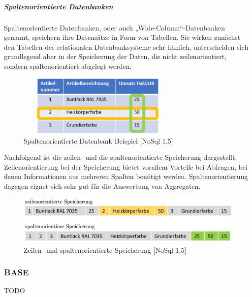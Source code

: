\subparagraph{Spaltenorientierte Datenbanken}
Spaltenorientierte Datenbanken, oder auch „Wide-Column“-Datenbanken genannt, speichern ihre Datensätze in Form von Tabellen.  Sie wirken zunächst den Tabellen der relationalen Datenbanksysteme sehr ähnlich, unterscheiden sich grundlegend aber in der Speicherung der Daten, die nicht zeilenorientiert, sondern spaltenorientiert abgelegt werden. 


\begin{figure}[h]
\centering
\includegraphics[width=8cm, height = 3cm]{images/SpaltenorientiereDatenbank.png}
\caption{Spaltenorientierte Datenbank Beispiel [NoSql 1.5]}
\end{figure}

Nachfolgend ist die zeilen- und die spaltenorientierte Speicherung dargestellt. Zeilenorientierung bei der Speicherung bietet vorallem Vorteile bei Abfragen, bei denen Informationen aus mehreren Spalten benötigt werden.
Spaltenorientierung dagegen eignet sich sehr gut für die Auswertung von Aggregaten.
\newline




\begin{figure}[htb]
\centering
\includegraphics[width=15cm]{images/zeilenspaltenorientiert.png}
\caption{Zeilen- und spaltenorientierte Speicherung [NoSql 1.5]}
\end{figure}

\subsubsection{BASE}
TODO
\newline


